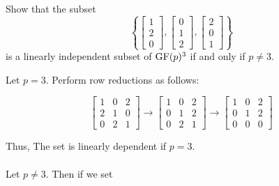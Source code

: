 
\begin{ProbBox} %
\begin{problem}[Golan 177]
Show that the subset
\[
\left\{ 
\begin{bmatrix}
  1\\[0.3em] 2\\[0.3em] 0
\end{bmatrix},
\begin{bmatrix}
  0\\[0.3em] 1\\[0.3em] 2
\end{bmatrix},
\begin{bmatrix}
  2\\[0.3em] 0\\[0.3em] 1
\end{bmatrix}
\right\}
\]
is a linearly independent subset of $\operatorname{GF}(p)^3$ if and only if $p\neq 3$.
\end{problem}
\smallskip
\begin{solution}
Let $p=3$. Perform row reductions as follows:

\[ \left[ \begin{array}{ccc}
1 & 0 & 2 \\
2 & 1 & 0 \\
0 & 2 & 1
\end{array} \right]
%
\rightarrow
%
\left[ \begin{array}{ccc}
1 & 0 & 2 \\
0 & 1 & 2 \\
0 & 2 & 1
\end{array} \right]
%
\rightarrow
%
\left[ \begin{array}{ccc}
1 & 0 & 2 \\
0 & 1 & 2 \\
0 & 0 & 0
\end{array} \right]
\]

Thus, The set is linearly dependent if $p=3$. \\ \\

Let $p \neq 3$. Then if we set 


\end{solution}
\end{ProbBox}
